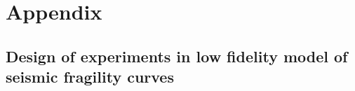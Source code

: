 \documentclass[a4paper]{book}
\renewcommand{\familydefault}{\sfdefault}
\begin{document}
\appendix
\part*{Appendix}


\chapter{Design of experiments in low fidelity model of seismic fragility curves}



 
 
\printbibliography 
{}


\renewcommand{\familydefault}{\sfdefault}


 
\end{document}
